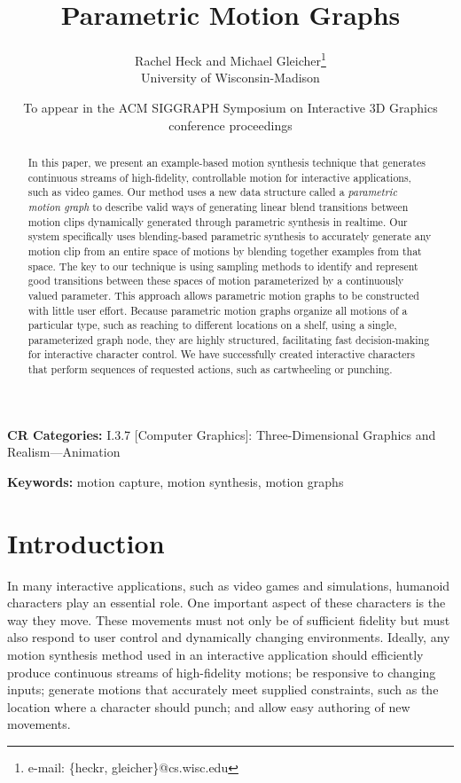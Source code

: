 \documentclass[10pt,twocolumn]{article}
\title{Parametric Motion Graphs}
\author{
Rachel Heck and Michael Gleicher\thanks{e-mail: \{heckr, gleicher\}@cs.wisc.edu}\\
University of Wisconsin-Madison
}
\date{\small To appear in the ACM SIGGRAPH Symposium on Interactive 3D Graphics conference proceedings}
\begin{document}
\maketitle

\begin{abstract}
In this paper, we present an example-based motion synthesis technique that generates continuous streams of high-fidelity, controllable motion for interactive applications, such as video games. Our method uses a new data structure called a \emph{parametric motion graph} to describe valid ways of generating linear blend transitions between motion clips dynamically generated through parametric synthesis in realtime. Our system specifically uses blending-based parametric synthesis to accurately generate any motion clip from an entire space of motions by blending together examples from that space. The key to our technique is using sampling methods to identify and represent good transitions between these spaces of motion parameterized by a continuously valued parameter. This approach allows parametric motion graphs to be constructed with little user effort. Because parametric motion graphs organize all motions of a particular type, such as reaching to different locations on a shelf, using a single, parameterized graph node, they are highly structured, facilitating fast decision-making for interactive character control. We have successfully created interactive characters that perform sequences of requested actions, such as cartwheeling or punching.
\end{abstract}

\noindent\textbf{CR Categories:} I.3.7 [Computer Graphics]: Three-Dimensional Graphics and Realism---Animation

\noindent\textbf{Keywords:} motion capture, motion synthesis, motion graphs

\section{Introduction}

In many interactive applications, such as video games and simulations, humanoid characters play an essential role. One important aspect of these characters is the way they move. These movements must not only be of sufficient fidelity but must also respond to user control and dynamically changing environments. Ideally, any motion synthesis method used in an interactive application should efficiently produce continuous streams of high-fidelity motions; be responsive to changing inputs; generate motions that accurately meet supplied constraints, such as the location where a character should punch; and allow easy authoring of new movements.
\end{document}
